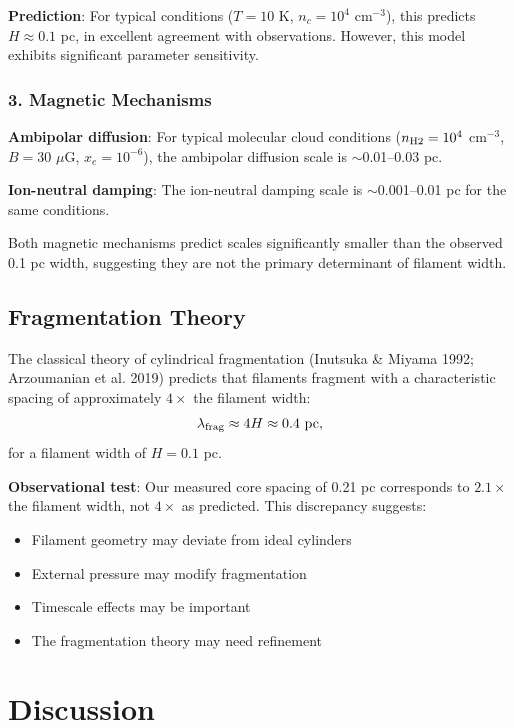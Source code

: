 \documentclass[11pt,a4paper]{article}
\begin{document}
\textbf{Prediction}: For typical conditions ($T = 10$ K, $n_c = 10^4$ cm$^{-3}$), this predicts $H \approx 0.1$ pc, in excellent agreement with observations. However, this model exhibits significant parameter sensitivity.

\subsubsection{3. Magnetic Mechanisms}

\textbf{Ambipolar diffusion}: For typical molecular cloud conditions ($n_{\rm H2} = 10^4$ cm$^{-3}$, $B = 30$ $\mu$G, $x_e = 10^{-6}$), the ambipolar diffusion scale is $\sim$0.01--0.03 pc.

\textbf{Ion-neutral damping}: The ion-neutral damping scale is $\sim$0.001--0.01 pc for the same conditions.

Both magnetic mechanisms predict scales significantly smaller than the observed 0.1 pc width, suggesting they are not the primary determinant of filament width.

\subsection{Fragmentation Theory}

The classical theory of cylindrical fragmentation (Inutsuka \& Miyama 1992; Arzoumanian et al. 2019) predicts that filaments fragment with a characteristic spacing of approximately $4\times$ the filament width:
\begin{equation}
\lambda_{\rm frag} \approx 4 H \approx 0.4~{\rm pc},
\end{equation}
for a filament width of $H = 0.1$ pc.

\textbf{Observational test}: Our measured core spacing of 0.21 pc corresponds to $2.1\times$ the filament width, not $4\times$ as predicted. This discrepancy suggests:
\begin{itemize}
    \item Filament geometry may deviate from ideal cylinders
    \item External pressure may modify fragmentation
    \item Timescale effects may be important
    \item The fragmentation theory may need refinement
\end{itemize}

\section{Discussion}
\end{document}
